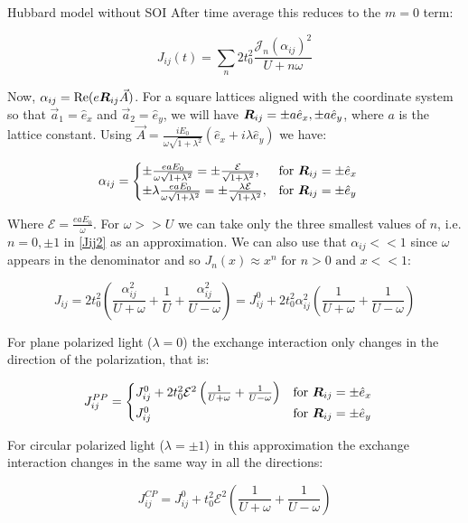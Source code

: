 \begin{section}{Hubbard model without SOI}
After time average this reduces to the $m=0$ term:

\begin{equation}
\label{Jij2}
J_{ij}(t) = \sum_{n} 2t_0^2 \frac{\mathcal{J}_n(\alpha_{ij})^2}{U+n\omega}
\end{equation}

Now, $\alpha_{ij} = \text{Re}(e\boldsymbol{R}_{ij}\vec{A})$. For a square lattices aligned with the coordinate system so that $\vec{a}_1=\hat{e}_x$ and $\vec{a}_2=\hat{e}_y$, we will have $\boldsymbol{R}_{ij} = \pm a\hat{e}_x,\pm a\hat{e}_y$, where $a$ is the lattice constant. Using $\vec{A}=\frac{iE_0}{\omega\sqrt{1+\lambda^2}}(\hat{e}_x+i\lambda\hat{e}_y)$ we have:

\begin{equation}
\alpha_{ij} = \begin{cases}
             \pm \frac{eaE_0}{\omega \sqrt{1+\lambda^2}} = \pm \frac{\mathcal{E}}{\sqrt{1+\lambda^2}},  & \text{for } \boldsymbol{R}_{ij} = \pm \hat{e}_x \\
             \pm \lambda\frac{eaE_0}{\omega \sqrt{1+\lambda^2}} = \pm \frac{\lambda \mathcal{E}}{\sqrt{1+\lambda^2}},  & \text{for } \boldsymbol{R}_{ij} = \pm \hat{e}_y
       \end{cases} \quad
\end{equation}

Where $\mathcal{E} = \frac{eaE_0}{\omega}$. For $\omega>>U$ we can take only the three smallest values of $n$, i.e. $n=0, \pm 1$ in \ref{Jij2} as an approximation. We can also use that $\alpha_{ij} << 1$ since $\omega$ appears in the denominator and so $J_n(x) \approx x^n \text{ for } n>0 \text{ and } x << 1$:

\begin{equation}
J_{ij} = 2t_0^2 \left(\frac{\alpha_{ij}^2}{U+\omega} +\frac{1}{U} +\frac{\alpha_{ij}^2}{U-\omega} \right) = J_{ij}^0 + 2t_0^2 \alpha_{ij}^2 \left( \frac{1}{U+\omega} + \frac{1}{U-\omega} \right)
\end{equation}

For plane polarized light ($\lambda = 0$) the exchange interaction only changes in the direction of the polarization, that is:

\begin{equation}
J_{ij}^{PP} = \begin{cases}
		J_{ij}^0 + 2t_0^2 \mathcal{E}^2 \left( \frac{1}{U+\omega} + \frac{1}{U-\omega} \right) & \text{for } \boldsymbol{R}_{ij} = \pm \hat{e}_x \\
J_{ij}^0 & \text{for } \boldsymbol{R}_{ij} = \pm \hat{e}_y
\end{cases} \quad 
\end{equation}

For circular polarized light ($\lambda=\pm1$) in this approximation the exchange interaction changes in the same way in all the directions:

\begin{equation}
J_{ij}^{CP} = J_{ij}^0 + t_0^2 \mathcal{E}^2 \left( \frac{1}{U+\omega} + \frac{1}{U-\omega} \right)
\end{equation}

\end{section}


